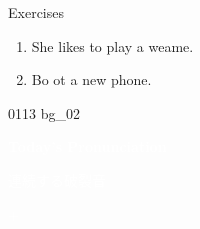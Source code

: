 \documentclass[aspectratio=169,xcolor={dvipsnames,table}]{beamer}
\begin{document}
\begin{frame}[plain]{Exercises }
  \hypertarget{ex}{}
  \Large
  \begin{enumerate}
    \item<2-> She likes to play a weame.
    \item<4-> Bo  ot a new phone.
  \end{enumerate}

  \hfill{\tiny 0113}\,{\scriptsize {}\,bg\_02}

\end{frame}
\begin{frame}
  \hypertarget{today}{}
  \centering
  \textcolor{white}{\Huge\bfseries Today's Pronunciation}

  \vspace{30pt}

  \textcolor{white}{\Large 連続する破裂音}

  \textcolor{white}{\Large {} $+$ }
\end{frame}
\end{document}
